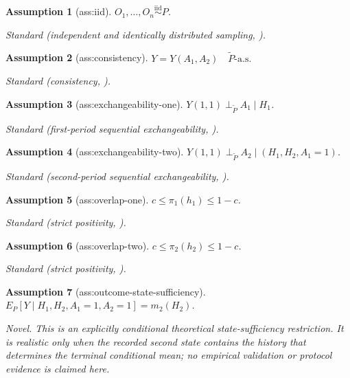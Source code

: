 \documentclass{article}
\newtheorem{assumption}{Assumption}
\begin{document}
\begin{assumption}[ass:iid]\label{ass:iid}
\(O_1,\ldots,O_n\overset{\mathrm{iid}}{\sim}P\).
\par\smallskip\noindent\emph{Standard} (independent and identically distributed sampling, \cite{Tsybakov2009}).
\end{assumption}

\begin{assumption}[ass:consistency]\label{ass:consistency}
\(Y=Y(A_1,A_2)\quad\widetilde P\text{-a.s.}\)
\par\smallskip\noindent\emph{Standard} (consistency, \cite{HernanRobins2020}).
\end{assumption}

\begin{assumption}[ass:exchangeability-one]\label{ass:exchangeability-one}
\(Y(1,1)\perp_{\widetilde P}A_1\mid H_1\).
\par\smallskip\noindent\emph{Standard} (first-period sequential exchangeability, \cite{HernanRobins2020}).
\end{assumption}

\begin{assumption}[ass:exchangeability-two]\label{ass:exchangeability-two}
\(Y(1,1)\perp_{\widetilde P}A_2\mid(H_1,H_2,A_1=1)\).
\par\smallskip\noindent\emph{Standard} (second-period sequential exchangeability, \cite{HernanRobins2020}).
\end{assumption}

\begin{assumption}[ass:overlap-one]\label{ass:overlap-one}
\(c\le\pi_1(h_1)\le1-c\).
\par\smallskip\noindent\emph{Standard} (strict positivity, \cite{HernanRobins2020}).
\end{assumption}

\begin{assumption}[ass:overlap-two]\label{ass:overlap-two}
\(c\le\pi_2(h_2)\le1-c\).
\par\smallskip\noindent\emph{Standard} (strict positivity, \cite{HernanRobins2020}).
\end{assumption}

\begin{assumption}[ass:outcome-state-sufficiency]\label{ass:outcome-state-sufficiency}
\(E_P[Y\mid H_1,H_2,A_1=1,A_2=1]=m_2(H_2)\).
\par\smallskip\noindent\emph{Novel.} This is an explicitly conditional theoretical state-sufficiency restriction. It is realistic only when the recorded second state contains the history that determines the terminal conditional mean; no empirical validation or protocol evidence is claimed here.
\end{assumption}
\end{document}
